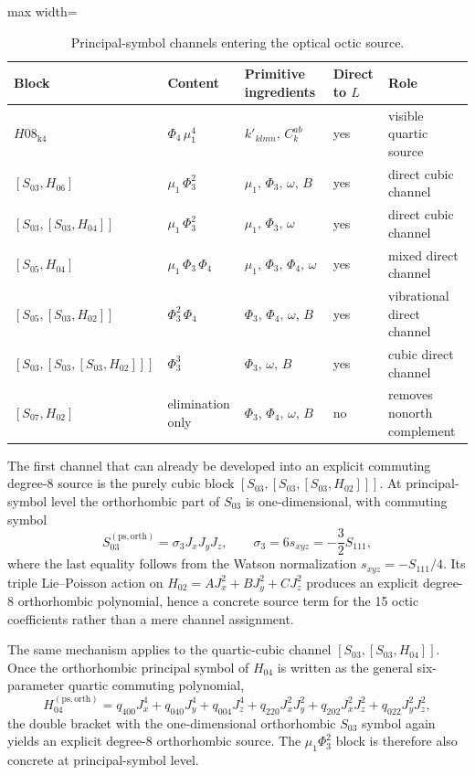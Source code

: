 \documentclass[aip,jcp,reprint,floatfix]{revtex4-2}
\begin{document}
\begin{table}[t]
\caption{Principal-symbol channels entering the optical octic source.}
\label{tab:octic_channels}
\begin{adjustbox}{max width=\columnwidth}
\begin{tabular}{lllll}
\toprule
Block & Content & Primitive ingredients & Direct to \(L\) & Role \\
\midrule
\(H08_{\mathrm{k4}}\) & \(\Phi_4\,\mu_1^4\) & \(k'_{klmn},\,C_k^{ab}\) & yes & visible quartic source \\
\([S_{03},H_{06}]\) & \(\mu_1\,\Phi_3^2\) & \(\mu_1,\,\Phi_3,\,\omega,\,B\) & yes & direct cubic channel \\
\([S_{03},[S_{03},H_{04}]]\) & \(\mu_1\,\Phi_3^2\) & \(\mu_1,\,\Phi_3,\,\omega\) & yes & direct cubic channel \\
\([S_{05},H_{04}]\) & \(\mu_1\,\Phi_3\,\Phi_4\) & \(\mu_1,\,\Phi_3,\,\Phi_4,\,\omega\) & yes & mixed direct channel \\
\([S_{05},[S_{03},H_{02}]]\) & \(\Phi_3^2\,\Phi_4\) & \(\Phi_3,\,\Phi_4,\,\omega,\,B\) & yes & vibrational direct channel \\
\([S_{03},[S_{03},[S_{03},H_{02}]]]\) & \(\Phi_3^3\) & \(\Phi_3,\,\omega,\,B\) & yes & cubic direct channel \\
\([S_{07},H_{02}]\) & elimination only & \(\Phi_3,\,\Phi_4,\,\omega,\,B\) & no & removes nonorth complement \\
\bottomrule
\end{tabular}
\end{adjustbox}
\end{table}

The first channel that can already be developed into an explicit commuting
degree-8 source is the purely cubic block
\([S_{03},[S_{03},[S_{03},H_{02}]]]\). At principal-symbol level the
orthorhombic part of \(S_{03}\) is one-dimensional, with commuting symbol
\[
S_{03}^{(\mathrm{ps},\mathrm{orth})}
=
\sigma_3 J_xJ_yJ_z,
\qquad
\sigma_3 = 6 s_{xyz} = -\frac{3}{2}S_{111},
\]
where the last equality follows from the Watson normalization
\(s_{xyz}=-S_{111}/4\). Its triple Lie--Poisson action on
\(H_{02}=A J_x^2+B J_y^2+C J_z^2\) produces an explicit degree-8
orthorhombic polynomial, hence a concrete source term for the 15 octic
coefficients rather than a mere channel assignment.

The same mechanism applies to the quartic-cubic channel
\([S_{03},[S_{03},H_{04}]]\). Once the orthorhombic principal symbol of
\(H_{04}\) is written as the general six-parameter quartic commuting
polynomial,
\[
H_{04}^{(\mathrm{ps},\mathrm{orth})}
=
q_{400}J_x^4+q_{040}J_y^4+q_{004}J_z^4
+q_{220}J_x^2J_y^2+q_{202}J_x^2J_z^2+q_{022}J_y^2J_z^2,
\]
the double bracket with the one-dimensional orthorhombic \(S_{03}\) symbol
again yields an explicit degree-8 orthorhombic source. The
\(\mu_1\Phi_3^2\) block is therefore also concrete at principal-symbol level.
\end{document}
